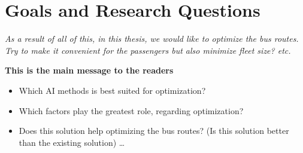 \section{Goals and Research Questions}

\textit{As a result of all of this, in this thesis, we would like to optimize the bus routes. Try to make it convenient for the passengers but also minimize fleet size? etc.}


\textbf{This is the main message to the readers}
\begin{itemize}
  \item Which AI methods is best suited for optimization?
  \item Which factors play the greatest role, regarding optimization?
  \item Does this solution help optimizing the bus routes? (Is this solution better than the existing solution)
   \ldots
\end{itemize}